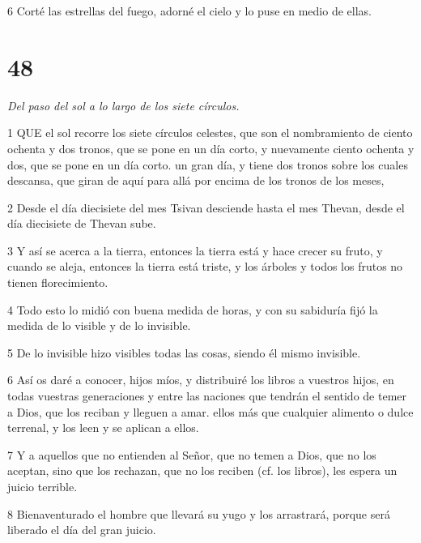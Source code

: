 \par 6 Corté las estrellas del fuego, adorné el cielo y lo puse en medio de ellas.

\chapter{48}

\par \textit{Del paso del sol a lo largo de los siete círculos.}

\par 1 QUE el sol recorre los siete círculos celestes, que son el nombramiento de ciento ochenta y dos tronos, que se pone en un día corto, y nuevamente ciento ochenta y dos, que se pone en un día corto. un gran día, y tiene dos tronos sobre los cuales descansa, que giran de aquí para allá por encima de los tronos de los meses,

\par 2 Desde el día diecisiete del mes Tsivan desciende hasta el mes Thevan, desde el día diecisiete de Thevan sube.

\par 3 Y así se acerca a la tierra, entonces la tierra está y hace crecer su fruto, y cuando se aleja, entonces la tierra está triste, y los árboles y todos los frutos no tienen florecimiento.

\par 4 Todo esto lo midió con buena medida de horas, y con su sabiduría fijó la medida de lo visible y de lo invisible.

\par 5 De lo invisible hizo visibles todas las cosas, siendo él mismo invisible.

\par 6 Así os daré a conocer, hijos míos, y distribuiré los libros a vuestros hijos, en todas vuestras generaciones y entre las naciones que tendrán el sentido de temer a Dios, que los reciban y lleguen a amar. ellos más que cualquier alimento o dulce terrenal, y los leen y se aplican a ellos.

\par 7 Y a aquellos que no entienden al Señor, que no temen a Dios, que no los aceptan, sino que los rechazan, que no los reciben (cf. los libros), les espera un juicio terrible.

\par 8 Bienaventurado el hombre que llevará su yugo y los arrastrará, porque será liberado el día del gran juicio.

